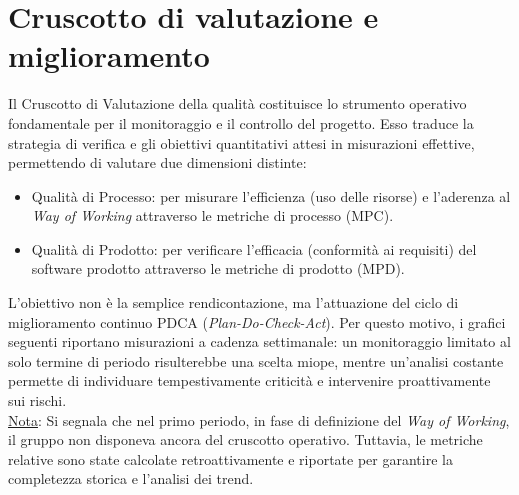 \documentclass[a4paper,12pt]{article}
\begin{document}
\section{Cruscotto di valutazione e miglioramento}

Il Cruscotto di Valutazione della qualità costituisce lo strumento operativo fondamentale per il monitoraggio e il controllo del progetto. Esso traduce la strategia di verifica e gli obiettivi quantitativi attesi in misurazioni effettive, permettendo di valutare due dimensioni distinte:
\begin{itemize}
    \item Qualità di Processo: per misurare l'efficienza (uso delle risorse) e l'aderenza al \textit{Way of Working} attraverso le metriche di processo (MPC).
    \item Qualità di Prodotto: per verificare l'efficacia (conformità ai requisiti) del software prodotto attraverso le metriche di prodotto (MPD).
\end{itemize}

L'obiettivo non è la semplice rendicontazione, ma l'attuazione del ciclo di miglioramento continuo PDCA (\textit{Plan-Do-Check-Act}). Per questo motivo, i grafici seguenti riportano misurazioni a cadenza settimanale: un monitoraggio limitato al solo termine di periodo risulterebbe una scelta miope, mentre un'analisi costante permette di individuare tempestivamente criticità e intervenire proattivamente sui rischi.\\

\noindent \ul{Nota}: Si segnala che nel primo periodo, in fase di definizione del \textit{Way of Working}, il gruppo non disponeva ancora del cruscotto operativo. Tuttavia, le metriche relative sono state calcolate retroattivamente e riportate per garantire la completezza storica e l'analisi dei trend.
\end{document}
